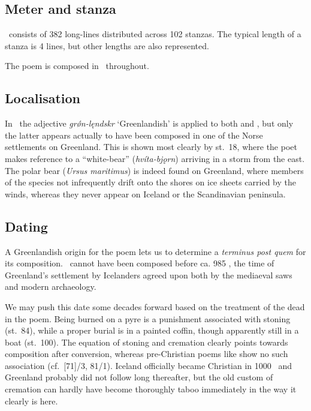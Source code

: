 \subsection{Meter and stanza}

\Atlamal\ consists of 382 long-lines distributed across 102 stanzas.  The typical length of a stanza is 4 lines, but other lengths are also represented.

The poem is composed in \Malahattr\ throughout.

\subsection{Localisation}

In \Regius\ the adjective \emph{grǿn-lęndskr} ‘Greenlandish’ is applied to both  and \Atlamal, but only the latter appears actually to have been composed in one of the Norse settlements on Greenland.  This is shown most clearly by st.~18, where the poet makes reference to a “white-bear” (\emph{hvíta-bjǫrn}) arriving in a storm from the east.
The polar bear (\emph{Ursus maritimus}) is indeed found on Greenland, where members of the species not infrequently drift onto the shores on ice sheets carried by the winds, whereas they never appear on Iceland or the Scandinavian peninsula.

\subsection{Dating}

A Greenlandish origin for the poem lets us to determine a \emph{terminus post quem} for its composition.  \Atlamal\ cannot have been composed before ca. 985 \ce, the time of Greenland’s settlement by Icelanders agreed upon both by the mediaeval saws and modern archaeology.

We may push this date some decades forward based on the treatment of the dead in the poem.  Being burned on a pyre is a punishment associated with stoning (st.~84), while a proper burial is in a painted coffin, though apparently still in a boat (st.~100).  The equation of stoning and cremation clearly points towards composition after conversion, whereas pre-Christian poems like  show no such association (cf.~[71]/3, 81/1).  Iceland officially became Christian in 1000 \ce\ and Greenland probably did not follow long thereafter, but the old custom of cremation can hardly have become thoroughly taboo immediately in the way it clearly is here.

